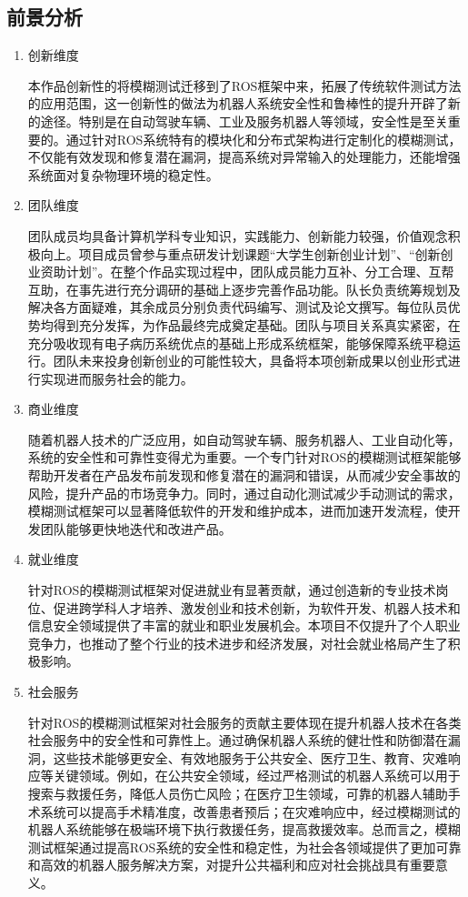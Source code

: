 \subsection{前景分析}
\begin{enumerate}
  \item 创新维度
  
  本作品创新性的将模糊测试迁移到了ROS框架中来，拓展了传统软件测试方法的应用范围，这一创新性的做法为机器人系统安全性和鲁棒性的提升开辟了新的途径。特别是在自动驾驶车辆、工业及服务机器人等领域，安全性是至关重要的。通过针对ROS系统特有的模块化和分布式架构进行定制化的模糊测试，不仅能有效发现和修复潜在漏洞，提高系统对异常输入的处理能力，还能增强系统面对复杂物理环境的稳定性。
  
  \item 团队维度
  
  团队成员均具备计算机学科专业知识，实践能力、创新能力较强，价值观念积极向上。项目成员曾参与重点研发计划课题“大学生创新创业计划”、“创新创业资助计划”。在整个作品实现过程中，团队成员能力互补、分工合理、互帮互助，在事先进行充分调研的基础上逐步完善作品功能。队长负责统筹规划及解决各方面疑难，其余成员分别负责代码编写、测试及论文撰写。每位队员优势均得到充分发挥，为作品最终完成奠定基础。团队与项目关系真实紧密，在充分吸收现有电子病历系统优点的基础上形成系统框架，能够保障系统平稳运行。团队未来投身创新创业的可能性较大，具备将本项创新成果以创业形式进行实现进而服务社会的能力。
  
  \item 商业维度
  
  随着机器人技术的广泛应用，如自动驾驶车辆、服务机器人、工业自动化等，系统的安全性和可靠性变得尤为重要。一个专门针对ROS的模糊测试框架能够帮助开发者在产品发布前发现和修复潜在的漏洞和错误，从而减少安全事故的风险，提升产品的市场竞争力。同时，通过自动化测试减少手动测试的需求，模糊测试框架可以显著降低软件的开发和维护成本，进而加速开发流程，使开发团队能够更快地迭代和改进产品。
  
  \item 就业维度
  
  针对ROS的模糊测试框架对促进就业有显著贡献，通过创造新的专业技术岗位、促进跨学科人才培养、激发创业和技术创新，为软件开发、机器人技术和信息安全领域提供了丰富的就业和职业发展机会。本项目不仅提升了个人职业竞争力，也推动了整个行业的技术进步和经济发展，对社会就业格局产生了积极影响。
  
  \item 社会服务
  
  针对ROS的模糊测试框架对社会服务的贡献主要体现在提升机器人技术在各类社会服务中的安全性和可靠性上。通过确保机器人系统的健壮性和防御潜在漏洞，这些技术能够更安全、有效地服务于公共安全、医疗卫生、教育、灾难响应等关键领域。例如，在公共安全领域，经过严格测试的机器人系统可以用于搜索与救援任务，降低人员伤亡风险；在医疗卫生领域，可靠的机器人辅助手术系统可以提高手术精准度，改善患者预后；在灾难响应中，经过模糊测试的机器人系统能够在极端环境下执行救援任务，提高救援效率。总而言之，模糊测试框架通过提高ROS系统的安全性和稳定性，为社会各领域提供了更加可靠和高效的机器人服务解决方案，对提升公共福利和应对社会挑战具有重要意义。
\end{enumerate}
